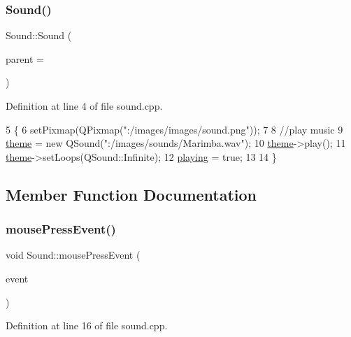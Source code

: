 \subsubsection{\texorpdfstring{Sound()}{Sound()}}
{\footnotesize\ttfamily Sound\+::\+Sound (\begin{DoxyParamCaption}\item[{Q\+Graphics\+Item $\ast$}]{parent = {} }\end{DoxyParamCaption})}



Definition at line 4 of file sound.\+cpp.


\begin{DoxyCode}
5 \{
6     setPixmap(QPixmap(\textcolor{stringliteral}{":/images/images/sound.png"}));
7 
8     \textcolor{comment}{//play music}
9     \hyperlink{class_sound_a65c0e423d9a706534ed44f4383b5abc1}{theme} = \textcolor{keyword}{new} QSound(\textcolor{stringliteral}{":/images/sounds/Marimba.wav"});
10     \hyperlink{class_sound_a65c0e423d9a706534ed44f4383b5abc1}{theme}->play();
11     \hyperlink{class_sound_a65c0e423d9a706534ed44f4383b5abc1}{theme}->setLoops(QSound::Infinite);
12     \hyperlink{class_sound_a8651994f1462748b66bb224e4404c1c0}{playing} = \textcolor{keyword}{true};
13 
14 \}
\end{DoxyCode}


\subsection{Member Function Documentation}
\mbox{\label{class_sound_aa145fbdd386c6614d0713802b5c03e07}} 
\subsubsection{\texorpdfstring{mouse\+Press\+Event()}{mousePressEvent()}}
{\footnotesize\ttfamily void Sound\+::mouse\+Press\+Event (\begin{DoxyParamCaption}\item[{Q\+Graphics\+Scene\+Mouse\+Event $\ast$}]{event }\end{DoxyParamCaption})}



Definition at line 16 of file sound.\+cpp.


